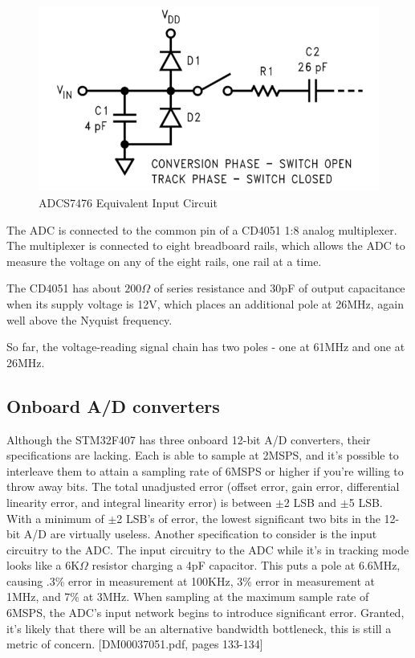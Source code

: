 \begin{figure}[h!]
  \begin{center}
      \includegraphics[width=.5\textwidth]{../adc-input-equiv.png}
      \caption{ADCS7476 Equivalent Input Circuit}
  \end{center}
\end{figure}


The ADC is connected to the common pin of a CD4051 1:8 analog multiplexer.
The multiplexer is connected to eight breadboard rails, which allows the ADC to measure the voltage on any of the eight rails, one rail at a time.

The CD4051 has about $200\Omega$ of series resistance and 30pF of output capacitance when its supply voltage is 12V, which places an additional pole at 26MHz, again well above the Nyquist frequency.

So far, the voltage-reading signal chain has two poles - one at 61MHz and one at 26MHz.

\subsection{Onboard A/D converters}
Although the STM32F407 has three onboard 12-bit A/D converters, their specifications are lacking.
Each is able to sample at 2MSPS, and it's possible to interleave them to attain a sampling rate of 6MSPS or higher if you're willing to throw away bits.
The total unadjusted error (offset error, gain error, differential linearity error, and integral linearity error) is between $\pm$2 LSB and $\pm$5 LSB.
With a minimum of $\pm$2 LSB's of error, the lowest significant two bits in the 12-bit A/D are virtually useless.
Another specification to consider is the input circuitry to the ADC.
The input circuitry to the ADC while it's in tracking mode looks like a 6K$\Omega$ resistor charging a 4pF capacitor.
This puts a pole at 6.6MHz, causing .3\% error in measurement at 100KHz, 3\% error in measurement at 1MHz, and 7\% at 3MHz.
When sampling at the maximum sample rate of 6MSPS, the ADC's input network begins to introduce significant error.
Granted, it's likely that there will be an alternative bandwidth bottleneck, this is still a metric of concern.
[DM00037051.pdf, pages 133-134]

